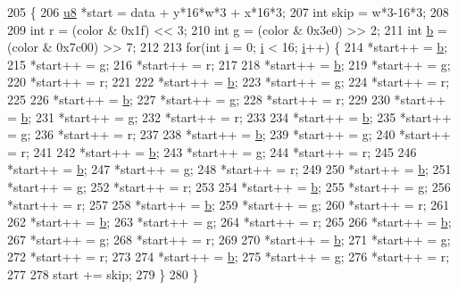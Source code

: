 \begin{DoxyCode}
205 \{
206   \mbox{\hyperlink{_system_8h_aed742c436da53c1080638ce6ef7d13de}{u8}} *start = data + y*16*w*3 + x*16*3;
207   \textcolor{keywordtype}{int} skip = w*3-16*3;
208 
209   \textcolor{keywordtype}{int} r = (color & 0x1f) << 3;
210   \textcolor{keywordtype}{int} g = (color & 0x3e0) >> 2;
211   \textcolor{keywordtype}{int} \mbox{\hyperlink{expr-lex_8cpp_a91b64995742fd30063314f12340b4b5a}{b}} = (color & 0x7c00) >> 7;
212 
213   \textcolor{keywordflow}{for}(\textcolor{keywordtype}{int} \mbox{\hyperlink{expr-lex_8cpp_acb559820d9ca11295b4500f179ef6392}{i}} = 0; \mbox{\hyperlink{expr-lex_8cpp_acb559820d9ca11295b4500f179ef6392}{i}} < 16; \mbox{\hyperlink{expr-lex_8cpp_acb559820d9ca11295b4500f179ef6392}{i}}++) \{
214     *start++ = \mbox{\hyperlink{expr-lex_8cpp_a91b64995742fd30063314f12340b4b5a}{b}};
215     *start++ = g;
216     *start++ = r;
217 
218     *start++ = \mbox{\hyperlink{expr-lex_8cpp_a91b64995742fd30063314f12340b4b5a}{b}};
219     *start++ = g;
220     *start++ = r;
221 
222     *start++ = \mbox{\hyperlink{expr-lex_8cpp_a91b64995742fd30063314f12340b4b5a}{b}};
223     *start++ = g;
224     *start++ = r;
225 
226     *start++ = \mbox{\hyperlink{expr-lex_8cpp_a91b64995742fd30063314f12340b4b5a}{b}};
227     *start++ = g;
228     *start++ = r;
229 
230     *start++ = \mbox{\hyperlink{expr-lex_8cpp_a91b64995742fd30063314f12340b4b5a}{b}};
231     *start++ = g;
232     *start++ = r;
233 
234     *start++ = \mbox{\hyperlink{expr-lex_8cpp_a91b64995742fd30063314f12340b4b5a}{b}};
235     *start++ = g;
236     *start++ = r;
237 
238     *start++ = \mbox{\hyperlink{expr-lex_8cpp_a91b64995742fd30063314f12340b4b5a}{b}};
239     *start++ = g;
240     *start++ = r;
241 
242     *start++ = \mbox{\hyperlink{expr-lex_8cpp_a91b64995742fd30063314f12340b4b5a}{b}};
243     *start++ = g;
244     *start++ = r;
245 
246     *start++ = \mbox{\hyperlink{expr-lex_8cpp_a91b64995742fd30063314f12340b4b5a}{b}};
247     *start++ = g;
248     *start++ = r;
249 
250     *start++ = \mbox{\hyperlink{expr-lex_8cpp_a91b64995742fd30063314f12340b4b5a}{b}};
251     *start++ = g;
252     *start++ = r;
253 
254     *start++ = \mbox{\hyperlink{expr-lex_8cpp_a91b64995742fd30063314f12340b4b5a}{b}};
255     *start++ = g;
256     *start++ = r;
257 
258     *start++ = \mbox{\hyperlink{expr-lex_8cpp_a91b64995742fd30063314f12340b4b5a}{b}};
259     *start++ = g;
260     *start++ = r;
261 
262     *start++ = \mbox{\hyperlink{expr-lex_8cpp_a91b64995742fd30063314f12340b4b5a}{b}};
263     *start++ = g;
264     *start++ = r;
265 
266     *start++ = \mbox{\hyperlink{expr-lex_8cpp_a91b64995742fd30063314f12340b4b5a}{b}};
267     *start++ = g;
268     *start++ = r;
269 
270     *start++ = \mbox{\hyperlink{expr-lex_8cpp_a91b64995742fd30063314f12340b4b5a}{b}};
271     *start++ = g;
272     *start++ = r;
273 
274     *start++ = \mbox{\hyperlink{expr-lex_8cpp_a91b64995742fd30063314f12340b4b5a}{b}};
275     *start++ = g;
276     *start++ = r;
277     
278     start += skip;
279   \}
280 \}
\end{DoxyCode}

